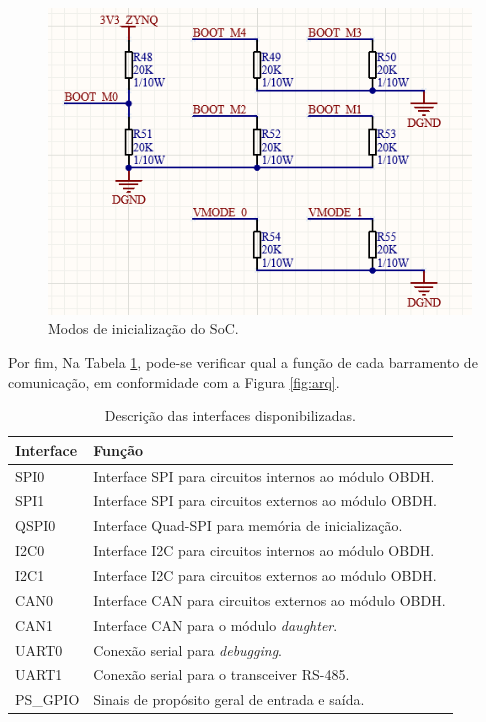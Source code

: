 \begin{figure}[H]
    \centering
    \includegraphics[scale=0.8]{images/bootmode.png}
    \caption{Modos de inicialização do SoC.}
    \label{fig:boot}
\end{figure}

Por fim, Na Tabela \ref{tab:interfaces}, pode-se verificar qual a função de cada barramento de comunicação, em conformidade com a Figura \ref{fig:arq}. 

\begin{table}[H]
	\ABNTEXfontereduzida
	\caption{\label{tab:interfaces}Descrição das interfaces disponibilizadas.}
    \centering
    \begin{tabular}{@{} >{\centering}p{4cm} >{\centering}p{8cm} @{}}
    
		\toprule
		\textbf{Interface} & \textbf{Função} \tabularnewline 
        \midrule
         SPI0 & Interface SPI para circuitos internos ao módulo OBDH. \tabularnewline
        \midrule
         SPI1 & Interface SPI para circuitos externos ao módulo OBDH.  \tabularnewline
        \midrule
         QSPI0 & Interface Quad-SPI para memória de inicialização. \tabularnewline
        \midrule
        I2C0  & Interface I2C para circuitos internos ao módulo OBDH. \tabularnewline
        \midrule
        I2C1  & Interface I2C para circuitos externos ao módulo OBDH.  \tabularnewline
        \midrule
        CAN0 & Interface CAN para circuitos externos ao módulo OBDH. \tabularnewline
        \midrule
        CAN1 & Interface CAN para o módulo \textit{daughter}. \tabularnewline
        \midrule
         UART0 & Conexão serial para \textit{debugging}. \tabularnewline
        \midrule
         UART1 & Conexão serial para o transceiver RS-485. \tabularnewline
        \midrule
         PS\_GPIO & Sinais de propósito geral de entrada e saída. \tabularnewline

        \bottomrule
	\end{tabular}
\end{table}

